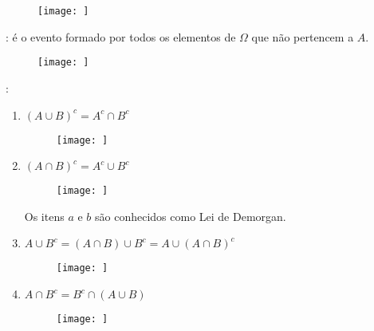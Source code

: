 \documentclass[11pt,a4paper]{book}
\begin{document}
\begin{description}
    \begin{figure}[]
      \centering
      \texttt{[image: ]}
      \caption{}
      \label{figura:5}
    \end{figure}
  \item [Evento Complementar ($\bar{A}$ ou $A^c$)]: é o evento formado por todos os elementos de $\Omega$ que não pertencem a $A$.
    \begin{description}
    \begin{figure}[]
      \centering
      \texttt{[image: ]}
      \caption{}
      \label{figura:6}
    \end{figure}

\item [Alguns exemplos de eventos complementares]: 

    \begin{enumerate}[align=left,label=({\alph*}) ]

      \item $(A \cup B )^c = A^c \cap B^c$
        \begin{figure}[]
          \centering
          \texttt{[image: ]}
          \caption{}
          \label{figura:7}
        \end{figure}

      \item $(A \cap B)^c = A^c \cup B^c $
        \begin{figure}[]
          \centering
          \texttt{[image: ]}
          \caption{}
          \label{figura:8}
        \end{figure}

        Os itens $a$ e $b$ são conhecidos como Lei de Demorgan.
      \item $A \cup B^c = ( A \cap B ) \cup B^c = A \cup (A \cap B)^c$
        \begin{figure}[]
          \centering
          \texttt{[image: ]}
          \caption{}
          \label{figura:9}

        \end{figure}

      \item  $A \cap B^c = B^c \cap (A \cup B)$
        \begin{figure}[]
          \centering
          \texttt{[image: ]}
          \caption{}
          \label{figura:10}
        \end{figure}

    \end{enumerate}


\end{description}
\end{description}
\end{document}
